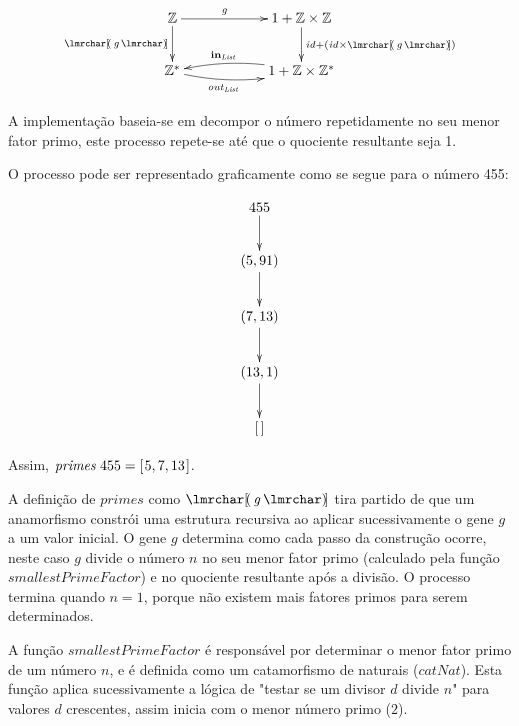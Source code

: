 \documentclass[11pt, a4paper, fleqn]{article}
\newcommand{\Conid}[1]{\mathit{#1}}
\newcommand{\Varid}[1]{\mathit{#1}}
\begin{document}
\begin{eqnarray*}
\xymatrix@C=2cm{
    \ensuremath{\mathbb{Z}}
           \ar[d]_-{\ensuremath{\anaList{\Varid{g}}}}
            \ar[r]^-{\ensuremath{\Varid{g}}} 
&
    \ensuremath{\mathrm{1}\mathbin{+}\mathbb{Z}} \times \ensuremath{\mathbb{Z}}
           \ar[d]^{\ensuremath{\Varid{id}\mathbin{+}(\Varid{id}} \times \ensuremath{\anaList{\Varid{g}}})}
\\
     \ensuremath{\mathbb{Z}}^*
            \ar@/_/[r]_-{\ensuremath{\Varid{out}}_\ensuremath{\Conid{List}}} 
&
     \ensuremath{\mathrm{1}\mathbin{+}\mathbb{Z}} \times \ensuremath{\mathbb{Z}}^*
           \ar@/_/[l]_-{\ensuremath{\mathbf{in}}_\ensuremath{\Conid{List}}}
}
\end{eqnarray*}

A implementação baseia-se em decompor o número repetidamente no seu menor fator primo, este processo repete-se até que o quociente resultante seja 1.

O processo pode ser representado graficamente como se segue para o número 455:

\begin{eqnarray*}
\xymatrix@C=2cm{
    \ensuremath{\mathrm{455}}
        \ar[d]
\\
    \ensuremath{(\mathrm{5},\mathrm{91})}
        \ar[d]
\\
    \ensuremath{(\mathrm{7},\mathrm{13})}
        \ar[d]
\\
    \ensuremath{(\mathrm{13},\mathrm{1})}
        \ar[d]
\\
    \ensuremath{[\mskip1.5mu \mskip1.5mu]}
}
\end{eqnarray*}

Assim, \ensuremath{\Varid{primes}\;\mathrm{455}\mathrel{=}[\mskip1.5mu \mathrm{5},\mathrm{7},\mathrm{13}\mskip1.5mu]}.

A definição de \ensuremath{\Varid{primes}} como \ensuremath{\anaList{\Varid{g}}} tira partido de que um anamorfismo constrói uma estrutura recursiva ao aplicar sucessivamente o gene \ensuremath{\Varid{g}} a um valor inicial.
O gene \ensuremath{\Varid{g}} determina como cada passo da construção ocorre, neste caso \ensuremath{\Varid{g}} divide o número \ensuremath{\Varid{n}} no seu menor fator primo (calculado pela função \ensuremath{\Varid{smallestPrimeFactor}}) e no quociente resultante após a divisão.
O processo termina quando \ensuremath{\Varid{n}\mathrel{=}\mathrm{1}}, porque não existem mais fatores primos para serem determinados.

A função \ensuremath{\Varid{smallestPrimeFactor}} é responsável por determinar o menor fator primo de um número \ensuremath{\Varid{n}}, e é definida como um catamorfismo de naturais (\ensuremath{\Varid{catNat}}).
Esta função aplica sucessivamente a lógica de "testar se um divisor \ensuremath{\Varid{d}} divide \ensuremath{\Varid{n}}" para valores \ensuremath{\Varid{d}} crescentes, assim inicia com o menor número primo (\ensuremath{\mathrm{2}}).
\end{document}
